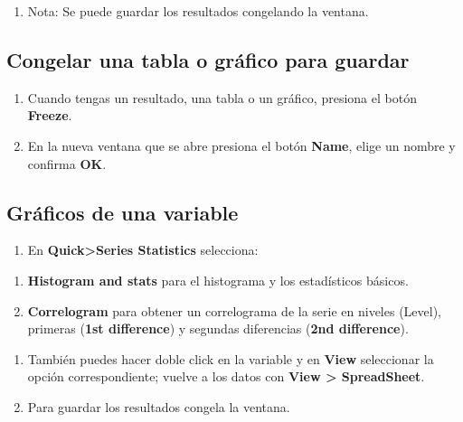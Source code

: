 \documentclass[
]{book}
\providecommand{\tightlist}{%
  \setlength{\itemsep}{0pt}\setlength{\parskip}{0pt}}
\begin{document}
\begin{enumerate}
\def\labelenumi{\arabic{enumi}.}
\setcounter{enumi}{3}
\tightlist
\item
  Nota: Se puede guardar los resultados congelando la ventana.
\end{enumerate}

\hypertarget{congelar-una-tabla-o-gruxe1fico-para-guardar}{%
\subsection{Congelar una tabla o gráfico para guardar}\label{congelar-una-tabla-o-gruxe1fico-para-guardar}}

\begin{enumerate}
\def\labelenumi{\arabic{enumi}.}
\tightlist
\item
  Cuando tengas un resultado, una tabla o un gráfico, presiona el botón \textbf{Freeze}.
\item
  En la nueva ventana que se abre presiona el botón \textbf{Name}, elige un nombre y confirma \textbf{OK}.
\end{enumerate}

\hypertarget{gruxe1ficos-de-una-variable}{%
\subsection{Gráficos de una variable}\label{gruxe1ficos-de-una-variable}}

\begin{enumerate}
\def\labelenumi{\arabic{enumi}.}
\tightlist
\item
  En \textbf{Quick\textgreater Series Statistics} selecciona:
\end{enumerate}

\begin{enumerate}
\def\labelenumi{(\alph{enumi})}
\tightlist
\item
  \textbf{Histogram and stats} para el histograma y los estadísticos básicos.
\item
  \textbf{Correlogram} para obtener un correlograma de la serie en niveles (Level), primeras (\textbf{1st difference}) y segundas diferencias (\textbf{2nd difference}).
\end{enumerate}

\begin{enumerate}
\def\labelenumi{\arabic{enumi}.}
\setcounter{enumi}{1}
\tightlist
\item
  También puedes hacer doble click en la variable y en \textbf{View} seleccionar la opción correspondiente; vuelve a los datos con \textbf{View \textgreater{} SpreadSheet}.
\item
  Para guardar los resultados congela la ventana.
\end{enumerate}
\end{document}
